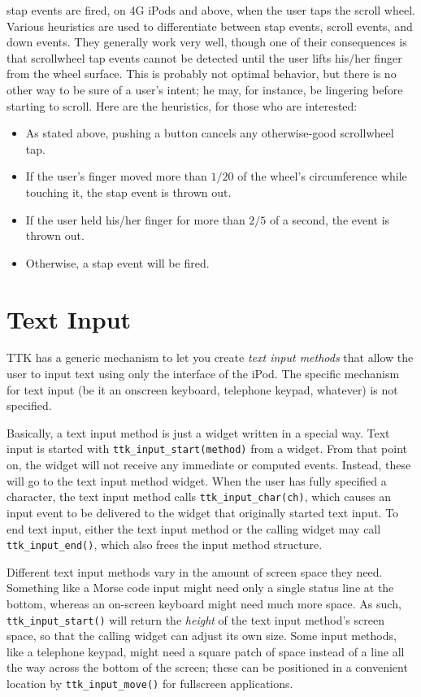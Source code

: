 \documentclass[12pt,letterpaper]{report}
\begin{document}
{\sf stap} events are fired, on 4G iPods and above, when the user taps the scroll wheel. Various heuristics
are used to differentiate between {\sf stap} events, {\sf scroll} events, and {\sf down} events.
They generally work very well, though one of their consequences is that scrollwheel tap events cannot
be detected until the user lifts his/her finger from the wheel surface. This is probably not optimal
behavior, but there is no other way to be sure of a user's intent; he may, for instance, be lingering
before starting to scroll. Here are the heuristics, for those who are interested:
\begin{itemize}
\item As stated above, pushing a button cancels any otherwise-good scrollwheel tap.
\item If the user's finger moved more than $1/20$ of the wheel's circumference while touching it,
      the {\sf stap} event is thrown out.
\item If the user held his/her finger for more than $2/5$ of a second, the event is thrown out.
\item Otherwise, a {\sf stap} event will be fired.
\end{itemize}

\section{Text Input}
TTK has a generic mechanism to let you create {\sl text input methods} that allow the user to input
text using only the interface of the iPod. The specific mechanism for text input (be it an onscreen
keyboard, telephone keypad, whatever) is not specified.

Basically, a text input method is just a widget written in a special way. Text input is started
with \verb|ttk_input_start(method)| from a widget. From that point on, the widget will not receive
any immediate or computed events. Instead, these will go to the text input method widget. When the
user has fully specified a character, the text input method calls \verb|ttk_input_char(ch)|, which
causes an {\sf input} event to be delivered to the widget that originally started text input.
To end text input, either the text input method or the calling widget may call \verb|ttk_input_end()|,
which also frees the input method structure.

Different text input methods vary in the amount of screen space they need. Something like a Morse code
input might need only a single status line at the bottom, whereas an on-screen keyboard might need
much more space. As such, \verb|ttk_input_start()| will return the {\em height} of the text input method's
screen space, so that the calling widget can adjust its own size. Some input methods, like a telephone keypad,
might need a square patch of space instead of a line all the way across the bottom of the screen;
these can be positioned in a convenient location by \verb|ttk_input_move()| for fullscreen applications.
\end{document}
